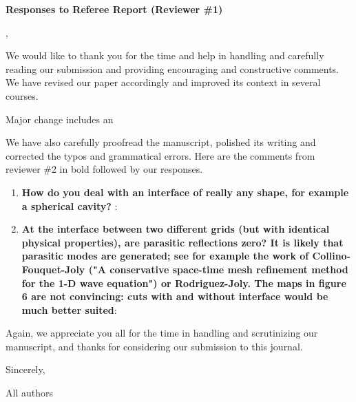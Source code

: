 \documentclass[twoside,11pt]{article}
\begin{document}
\begin{center}
{\Large \textbf{Responses to Referee Report (Reviewer \#1)}}
\end{center}

,

We would like to thank you for the time and help in handling and carefully reading our submission and providing encouraging and constructive comments.  We have revised our paper accordingly and improved its context in several courses. 

Major change includes an 

We have also carefully proofread the manuscript, polished its writing and corrected the typos and grammatical errors.  Here are the comments from reviewer \#2 in bold followed by our responses.

\begin{enumerate}
\item \textbf{How do you deal with an interface of really any shape, for example a spherical cavity? }: 

\item  \textbf{At the interface between two different grids (but with identical physical properties), are parasitic reflections zero? It is likely that parasitic modes are generated; see for example the work of Collino-Fouquet-Joly ("A conservative space-time mesh refinement method for the 1-D wave equation") or Rodriguez-Joly. The maps in figure 6 are not convincing: cuts with and without interface would be much better suited}: 

\end{enumerate}

Again, we appreciate you all for the time in handling and scrutinizing our manuscript, and thanks for considering our submission to this journal.

Sincerely, 

All authors
\end{document}
